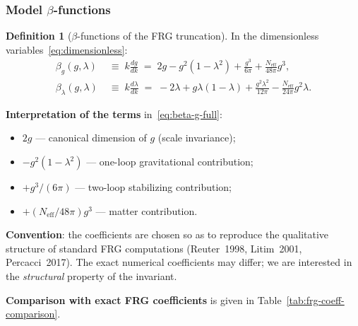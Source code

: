 \documentclass[11pt,a4paper]{article}
\theoremstyle{definition}
\newtheorem{definition}[theorem]{Definition}
\begin{document}
\subsubsection{Model \texorpdfstring{$\beta$}{}-functions}

\begin{definition}[$\beta$-functions of the FRG truncation]
\label{def:frg-beta}
In the dimensionless variables~\eqref{eq:dimensionless}:
\begin{align}
    \beta_g(g, \lambda) &\;\equiv\; k \frac{dg}{dk}
    \;=\; 2g - g^2(1-\lambda^2) + \frac{g^3}{6\pi}
    + \frac{N_{\text{eff}}}{48\pi} g^3,
    \label{eq:beta-g-full} \\[0.5em]
    \beta_\lambda(g, \lambda) &\;\equiv\; k \frac{d\lambda}{dk}
    \;=\; -2\lambda + g\lambda(1-\lambda)
    + \frac{g^2 \lambda^2}{12\pi}
    - \frac{N_{\text{eff}}}{24\pi} g^2 \lambda.
    \label{eq:beta-lambda-full}
\end{align}
\end{definition}

\medskip\noindent
\textbf{Interpretation of the terms} in~\eqref{eq:beta-g-full}:
\begin{itemize}
    \item $2g$ --- canonical dimension of $g$ (scale invariance);
    \item $-g^2(1-\lambda^2)$ --- one-loop gravitational contribution;
    \item $+g^3/(6\pi)$ --- two-loop stabilizing contribution;
    \item $+(N_{\text{eff}}/48\pi)g^3$ --- matter contribution.
\end{itemize}

\medskip\noindent
\textbf{Convention}: the coefficients are chosen so as to
reproduce the qualitative structure of standard
FRG computations (Reuter~1998, Litim~2001, Percacci~2017).
The exact numerical coefficients may differ; we are interested in the
\emph{structural} property of the invariant.

\medskip\noindent
\textbf{Comparison with exact FRG coefficients}
is given in Table~\ref{tab:frg-coeff-comparison}.
\end{document}
